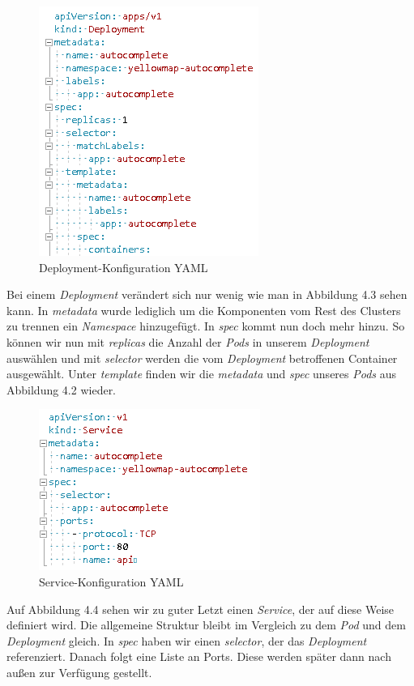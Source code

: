 \documentclass[12pt,a4paper]{scrartcl}
\begin{document}
\begin{figure}[h!]
	\centering
	\includegraphics[scale=1]{KubeYmlDep.png}
	\caption[Screenshot]{Deployment-Konfiguration YAML}
\end{figure}

Bei einem \emph{Deployment} verändert sich nur wenig wie man in Abbildung 4.3 sehen kann. In \emph{metadata} wurde lediglich um die Komponenten vom Rest des Clusters zu trennen ein \emph{Namespace} hinzugefügt. In \emph{spec} kommt nun doch mehr hinzu. So können wir nun mit \emph{replicas} die Anzahl der \emph{Pods} in unserem \emph{Deployment} auswählen und mit \emph{selector} werden die vom \emph{Deployment} betroffenen Container ausgewählt. Unter \emph{template} finden wir die \emph{metadata} und \emph{spec} unseres \emph{Pods} aus Abbildung 4.2 wieder.

\begin{figure}[h!]
	\centering
	\includegraphics[scale=1]{KubeYmlSvc.png}
	\caption[Screenshot]{Service-Konfiguration YAML}
\end{figure}

Auf Abbildung 4.4 sehen wir zu guter Letzt einen \emph{Service}, der auf diese Weise definiert wird. Die allgemeine Struktur bleibt im Vergleich zu dem \emph{Pod} und dem \emph{Deployment} gleich. In \emph{spec} haben wir einen \emph{selector}, der das \emph{Deployment} referenziert. Danach folgt eine Liste an Ports. Diese werden später dann nach außen zur Verfügung gestellt.
\end{document}
